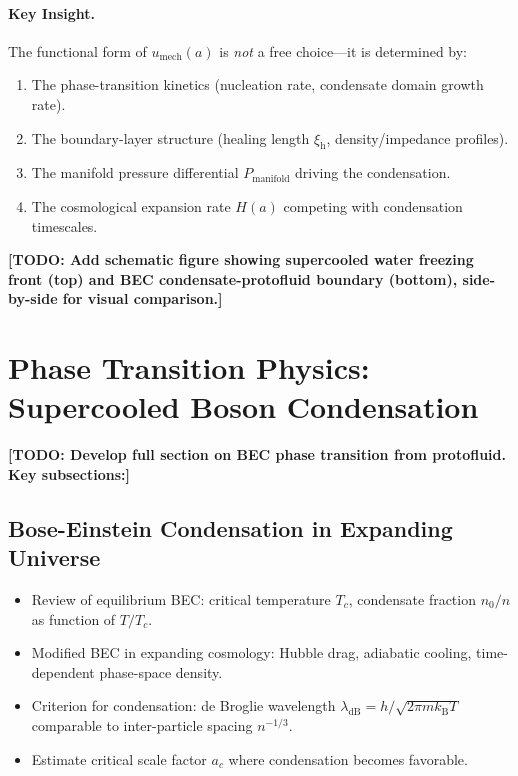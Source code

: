 \documentclass[11pt,a4paper]{article}
\newcommand{\kB}{\ensuremath{k_{\mathrm{B}}}}
\newcommand{\umech}{\ensuremath{u_{\mathrm{mech}}}}
\newcommand{\Pmanifold}{\ensuremath{P_{\mathrm{manifold}}}}
\newcommand{\xih}{\ensuremath{\xi_{\mathrm{h}}}}
\newcommand{\Tc}{\ensuremath{T_c}}
\theoremstyle{definition}
\theoremstyle{remark}
\begin{document}
\paragraph{Key Insight.}
The functional form of $\umech(a)$ is \emph{not} a free choice---it is determined by:
\begin{enumerate}[leftmargin=*, itemsep=0.3em]
\item The phase-transition kinetics (nucleation rate, condensate domain growth rate).
\item The boundary-layer structure (healing length $\xih$, density/impedance profiles).
\item The manifold pressure differential $\Pmanifold$ driving the condensation.
\item The cosmological expansion rate $H(a)$ competing with condensation timescales.
\end{enumerate}

\textbf{[TODO: Add schematic figure showing supercooled water freezing front (top) and BEC condensate-protofluid boundary (bottom), side-by-side for visual comparison.]}

\section{Phase Transition Physics: Supercooled Boson Condensation}
\label{sec:phase_transition}

\textbf{[TODO: Develop full section on BEC phase transition from protofluid. Key subsections:]}

\subsection{Bose-Einstein Condensation in Expanding Universe}
\label{sec:bec_expansion}

\begin{itemize}[leftmargin=*, itemsep=0.3em]
\item Review of equilibrium BEC: critical temperature $\Tc$, condensate fraction $n_0/n$ as function of $T/\Tc$.
\item Modified BEC in expanding cosmology: Hubble drag, adiabatic cooling, time-dependent phase-space density.
\item Criterion for condensation: de Broglie wavelength $\lambda_{\mathrm{dB}} = h/\sqrt{2\pi m \kB T}$ comparable to inter-particle spacing $n^{-1/3}$.
\item Estimate critical scale factor $a_c$ where condensation becomes favorable.
\end{itemize}
\end{document}

